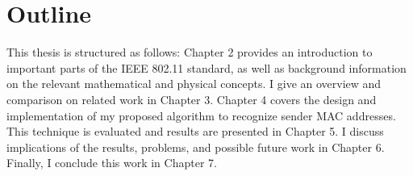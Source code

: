 
\section{Outline}

This thesis is structured as follows: Chapter 2 provides an introduction to important parts of the \gls{IEEE} 802.11 standard, as well as background information on the relevant mathematical and physical concepts. I give an overview and comparison on related work in Chapter 3. Chapter 4 covers the design and implementation of my proposed algorithm to recognize sender \gls{MAC} addresses. This technique is evaluated and results are presented in Chapter 5. I discuss implications of the results, problems, and possible future work in Chapter 6. Finally, I conclude this work in Chapter 7.
